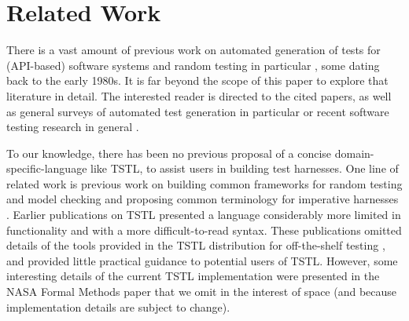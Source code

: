 \section{Related Work}

There is a vast amount of previous work on automated generation of
tests for (API-based) software systems
\cite{Pacheco,FA11,GodefroidKS05} and random testing in particular
\cite{ICSEDiff,Pacheco,AMFL11,ARTChen,ISSTAART,FASE,HamletOnly,Hamlet94,ClaessenH00,CiupaLOM07,RandFormal,woda08,andrews-etal-rute-rt,ASE08,evalrand,csmith},
some dating back to the early 1980s. It is far beyond the scope of
this paper to explore that literature in detail.  The interested
reader is directed to the cited papers, as well as general surveys of
automated test generation in particular \cite{anand2013orchestrated}
or recent software testing research in general \cite{orsofuse}.  



To our knowledge, there has been no previous proposal of a concise
domain-specific-language \cite{Fow10} like TSTL, to assist users in building test
harnesses.  One line of related work is previous work on
building common frameworks for random testing and model checking
\cite{woda08} and proposing common terminology for imperative
harnesses \cite{woda12}.  Earlier publications on TSTL \cite{NFM15,ISSTA15} presented a
language considerably more limited in functionality and with a more
difficult-to-read syntax.  These publications omitted details of the tools provided in the TSTL distribution for
off-the-shelf testing \cite{tstl}, and provided little practical
guidance to potential users of TSTL.  However, some interesting
details of the current TSTL implementation were presented in the NASA
Formal Methods paper \cite{NFM15} that we omit in
the interest of space (and because implementation details are subject
to change).

